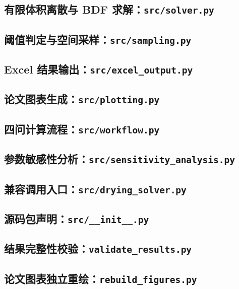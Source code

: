 \documentclass[12pt,a4paper,fontset=none]{ctexart}
\begin{document}
\subsection{有限体积离散与 BDF 求解：\texttt{src/solver.py}}


\subsection{阈值判定与空间采样：\texttt{src/sampling.py}}


\subsection{Excel 结果输出：\texttt{src/excel\_output.py}}


\subsection{论文图表生成：\texttt{src/plotting.py}}


\subsection{四问计算流程：\texttt{src/workflow.py}}


\subsection{参数敏感性分析：\texttt{src/sensitivity\_analysis.py}}


\subsection{兼容调用入口：\texttt{src/drying\_solver.py}}


\subsection{源码包声明：\texttt{src/\_\_init\_\_.py}}


\subsection{结果完整性校验：\texttt{validate\_results.py}}


\subsection{论文图表独立重绘：\texttt{rebuild\_figures.py}}


\endgroup
\end{document}
